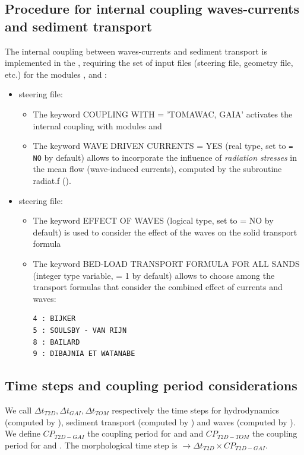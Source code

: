 \subsection{Procedure for internal coupling waves-currents and sediment transport}
The internal coupling between waves-currents and sediment transport is implemented in the \telemacsystem{}, requiring the set of input files (steering file, geometry file, etc.) for the modules , \tomawac{} and \gaia{}:
\begin{itemize}
  \item {} steering file:
\begin{itemize}
\item The keyword {\ttfamily COUPLING WITH = 'TOMAWAC, GAIA'} activates the internal coupling with modules \tomawac{} and \gaia{}
\item The keyword {\ttfamily WAVE DRIVEN CURRENTS = YES} (real type, set to \texttt{= NO} by default) allows to incorporate the influence of \textit{radiation stresses} in the mean flow (wave-induced currents), computed by the subroutine {\ttfamily radiat.f} (\tomawac{}).
\end{itemize}

 \item \gaia{} steering file:
\begin{itemize}
\item The keyword {\ttfamily EFFECT OF WAVES} (logical type, set to {\ttfamily = NO} by default) is used to consider the effect of the waves on the solid transport formula
\item The keyword {\ttfamily BED-LOAD TRANSPORT FORMULA FOR ALL SANDS} (integer type variable, {\ttfamily = 1} by default) allows to choose among the transport formulas that consider the combined effect of currents and waves:
\begin{lstlisting}[frame=trBL]
4 : BIJKER
5 : SOULSBY - VAN RIJN
8 : BAILARD
9 : DIBAJNIA ET WATANABE
\end{lstlisting}
\end{itemize}
\end{itemize}

\subsection{Time steps and coupling period considerations}
We call $\Delta t_{T2D}, \Delta t_{GAI}, \Delta t_{TOM}$ respectively the time steps for hydrodynamics (computed by ), sediment transport (computed by \gaia{}) and waves (computed by \tomawac{}). We define $CP_{T2D-GAI}$ the coupling period for  and \gaia{} and $CP_{T2D-TOM}$ the coupling period for  and \tomawac{}. The morphological time step is $\rightarrow \Delta t_{T2D} \times CP_{T2D-GAI}$.


